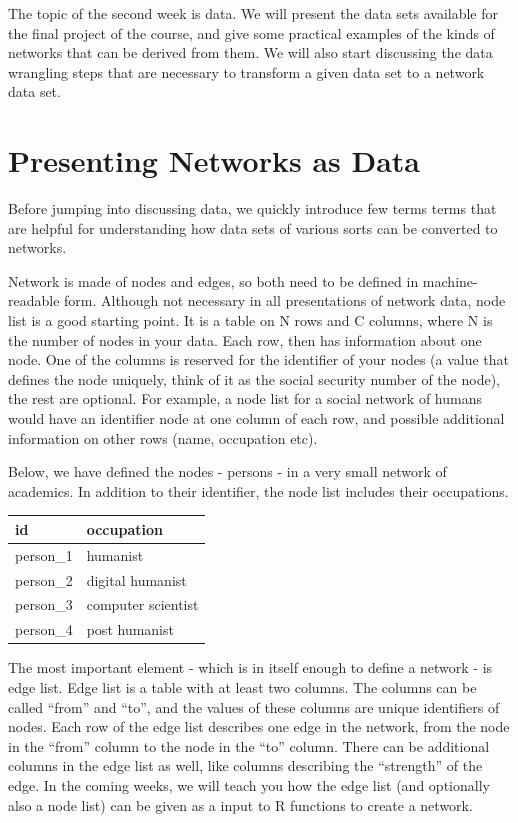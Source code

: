 \documentclass[
]{book}
\begin{document}
The topic of the second week is data. We will present the data sets available for the final project of the course,
and give some practical examples of the kinds of networks that can be derived from them. We will also start discussing the data wrangling steps that are necessary to transform a given data set to a network data set.

\hypertarget{presenting-networks-as-data}{%
\section{Presenting Networks as Data}\label{presenting-networks-as-data}}

Before jumping into discussing data, we quickly introduce few terms terms that are helpful for understanding how data sets of various
sorts can be converted to networks.

Network is made of nodes and edges, so both need to be defined in machine-readable form. Although not necessary in all presentations of network data, node list is a good starting point. It is a table on N rows and C columns, where N is the number of nodes in your data. Each row, then has information about one node. One of the columns is reserved for
the identifier of your nodes (a value that defines the node uniquely, think of it as the social security number of the node), the rest are optional. For example, a node list for a social network of humans would have an identifier node at one column of each row, and possible additional information on other rows (name, occupation etc).

Below, we have defined the nodes - persons - in a very small network of academics. In addition to their identifier,
the node list includes their occupations.

\begin{tabular}{l|l}
\hline
id & occupation\\
\hline
person\_1 & humanist\\
\hline
person\_2 & digital humanist\\
\hline
person\_3 & computer scientist\\
\hline
person\_4 & post humanist\\
\hline
\end{tabular}

The most important element - which is in itself enough to define a network - is edge list. Edge list is a table with at least two columns. The columns can be called ``from'' and ``to'', and the values of these columns are unique identifiers of nodes. Each row of the edge list describes one edge in the network, from the node in the ``from'' column to the node in the ``to'' column. There can be additional columns in the edge list as well, like columns describing the ``strength'' of the edge. In the coming weeks, we will teach you how the edge list (and optionally also a node list) can be given as a input to R functions to create a network.
\end{document}
